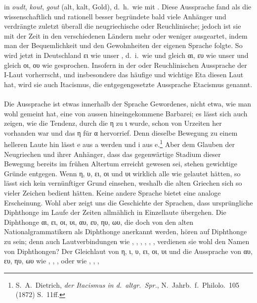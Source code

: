 in \emph{oudt}, \emph{kout}, \emph{gout} (alt, kalt, Gold), d.~h.~wie 
mit .
Diese Aussprache fand als die wissenschaftlich und rationell besser begründete
bald viele Anhänger und verdrängte zuletzt überall die neugriechische oder
Reuchlinische; jedoch ist sie mit der Zeit in den verschiedenen Ländern mehr
oder weniger ausgeartet, indem man der Bequemlichkeit und den Gewohnheiten der
eigenen Sprache folgte.
So wird jetzt in Deutschland ει wie unser , d.~i.~wie  und gleich αι, ευ wie
unser  und gleich οι, ου wie  gesprochen.
Insofern in der  oder Reuchlinischen Aussprache der I-Laut
vorherrscht, und insbesondere das häufige und wichtige Eta diesen Laut hat, wird
sie auch Itacismus, die entgegengesetzte Aussprache Etacismus genannt.

\paragraph{\label{sec:neugriechischediph}} Die 
Aussprache ist etwas innerhalb der
 Sprache Gewordenes, nicht etwa, wie man wohl gemeint hat,
eine von aussen hineingekommene Barbarei; es lässt sich auch zeigen, wie die
Tendenz, durch die η zu ι wurde, schon von Urzeiten her vorhanden war und das
 η für α hervorrief.
Denn dieselbe Bewegung zu einem helleren Laute hin lässt e aus a werden und i
aus e.\footnote{S.~A.~Dietrich, \emph{der Itacismus in d.\ altgr.\ Spr.}, N.\ Jahrb.\
	f.\ Philolo.\ 105 (1872) S.\ 11ff.}
Aber dem Glauben der Neugriechen und ihrer Anhänger, dass das gegenwärtige
Stadium dieser Bewegung bereits im frühen Altertum erreicht gewesen sei, stehen
gewichtige Gründe entgegen.
Wenn η, υ, ει, οι und υι wirklich alle wie  gelautet hätten, so lässt
sich kein vernünftiger Grund einsehen, weshalb die alten Griechen sich so vieler
Zeichen bedient hätten.
Keine andere Sprache bietet eine analoge Erscheinung.
Wohl aber zeigt uns die Geschichte der Sprachen, dass ursprüngliche Diphthonge
im Laufe der Zeiten allmählich in Einzellaute übergehen.
Die Diphthonge αι, ει, οι, υι, αυ, ευ, ηυ, ωυ, die doch von den alten
Nationalgrammatikern als Diphthonge anerkannt werden, hören auf Diphthonge zu
sein; denn auch Lautverbindungen wie \ipa{aw}, \ipa{ew}, \ipa{ow}, \ipa{af},
\ipa{ef}, \ipa{of}, verdienen sie wohl den Namen von Diphthongen?
Der Gleichlaut von η, ι, υ, ει, οι, υι und die Aussprache von αυ, ευ, ηυ, ωυ wie
\ipa{aw}, \ipa{ew}, \ipa{iw}, \ipa{ow} oder wie \ipa{af}, \ipa{ef}, \ipa{if},

